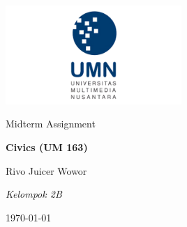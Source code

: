 \documentclass[
  12pt,
  answers  
]{exam}
\newcommand{\mytitle}{Civics (UM 163)}
\newcommand{\theauthor}{Rivo Juicer Wowor}
\newcommand{\affiliation}{Kelompok 2B}
\begin{document}
	\begin{titlepage}
		\centering
		\vspace{2cm}
		\includegraphics[width=0.5\textwidth]{../../ref/logoUMN.png}\par\vspace{1cm}
		\vspace{1.5cm}
		\large{Midterm Assignment} \par
		\vspace{1cm}
		\LARGE{\textbf{\mytitle}} \par
		\vspace{1.5cm}
		\large{\theauthor} \par
		\small{\emph{\affiliation}} \par
		\vfill
		\today
		\end{titlepage}	

    \begin{questions}
      \question 
          \pagebreak
    \end{questions}


		
\end{document}
